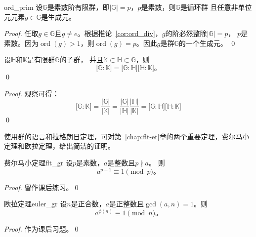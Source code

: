  	\begin{corollary}{}{ord_prim}
 	设$\mathbb{G}$是素数阶有限群，即$\vert \mathbb{G} \vert = p$，$p$是素数，则$ \mathbb{G}$是循环群
 	且任意非单位元元素$g \in \mathbb{G}$是生成元。 
 	\end{corollary}
 	
 	\begin{proof}
 	任取$g \in \mathbb{G}$且$g \neq e$。根据推论~\ref{cor:ord_div}，$g$的阶必然整除$\vert \mathbb{G} \vert = p$，
 	$p$是素数。因为$\operatorname{ord}(g) > 1$，则$\operatorname{ord}(g) = p$。因此$g$是群$\mathbb{G}$的一个生成元。 \qed
 	\end{proof}
 	
 	 \begin{corollary}{}{}
 	 设$\mathbb{H}$和$\mathbb{K}$是有限群$\mathbb{G}$的子群，
 	  	 	并且$\mathbb{K} \subset \mathbb{H} \subset \mathbb{G}$，则
 	 		\[\lbrack \mathbb{G}: \mathbb{K} \rbrack = \lbrack \mathbb{G} : \mathbb{H} \rbrack \lbrack \mathbb{H} : \mathbb{K} \rbrack \text{。}\]
 	 		\qed
 	 \end{corollary}
 
 \begin{proof}
观察可得：
 \[\lbrack \mathbb{G}: \mathbb{K} \rbrack =  \frac{\vert \mathbb{G} \vert }{\vert \mathbb{K} \vert}
 = \frac{\vert \mathbb{G} \vert }{\vert \mathbb{H} \vert} \frac{\vert \mathbb{H} \vert }{\vert \mathbb{K} \vert} = \lbrack \mathbb{G} : \mathbb{H} \rbrack \lbrack \mathbb{H} : \mathbb{K} \rbrack  \]
 \qed
 \end{proof}
 
 使用群的语言和拉格朗日定理，可对第~\ref{chap:flt-et}章的两个重要定理，费尔马小定理和欧拉定理，给出简洁的证明。
 	\begin{corollary}{费尔马小定理}{flt_gr}
 	设$p$是素数，$a$是整数且$p \nmid a$。
 	则\[a^{p-1} \equiv 1 \pmod{p}\text{。}\]
 	\end{corollary}
 	\begin{proof}
 	留作课后练习。\qed
 	\end{proof}
 	
 	\begin{corollary}{欧拉定理}{euler_gr}
 	设$n$是正合数，$a$是正整数且$\gcd(a,n)=1$。则
 	     \[a^{\phi(n)} \equiv 1 \pmod{n}\text{。}\]
 	\end{corollary}
 	
 	\begin{proof}
 	作为课后习题。\qed
 	\end{proof}
 	
